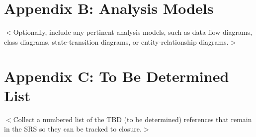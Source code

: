 \documentclass{scrreprt}
\begin{document}
\section{Appendix B: Analysis Models}
\begin{CJK}{UTF8}{<font>}
$<$Optionally, include any pertinent analysis models, such as data flow 
diagrams, class diagrams, state-transition diagrams, or entity-relationship 
diagrams.$>$
\end{CJK}

\section{Appendix C: To Be Determined List}
\begin{CJK}{UTF8}{<font>}
$<$Collect a numbered list of the TBD (to be determined) references that remain 
in the SRS so they can be tracked to closure.$>$
\end{CJK}
\end{document}

